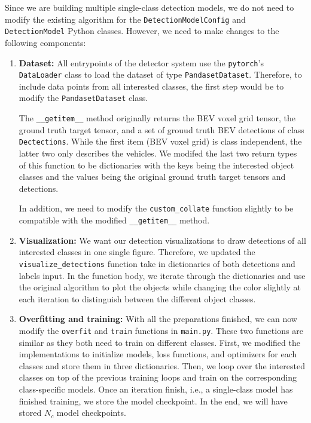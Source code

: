 \documentclass[letter]{article}
\begin{document}
	Since we are building multiple single-class detection models, we do not need to modify the existing algorithm for the \verb|DetectionModelConfig| and \verb|DetectionModel| Python classes. However, we need to make changes to the following components: \begin{enumerate}
		\item \textbf{Dataset:} All entrypoints of the detector system use the \verb|pytorch|'s \verb|DataLoader| class to load the dataset of type \verb|PandasetDataset|. Therefore, to include data points from all interested classes, the first step would be to modify the \verb|PandasetDataset| class. 
		
		The \verb|__getitem__| method originally returns the BEV voxel grid tensor, the ground truth target tensor, and a set of grouud truth BEV detections of class \verb|Dectections|. While the first item (BEV voxel grid) is class independent, the latter two only describes the vehicles. We modifed the last two return types of this function to be dictionaries with the keys being the interested object classes and the values being the original ground truth target tensors and detections. 

		In addition, we need to modify the \verb|custom_collate| function slightly to be compatible with the modified \verb|__getitem__| method. 

		\item \textbf{Visualization:} We want our detection visualizations to draw detections of all interested classes in one single figure. Therefore, we updated the \verb|visualize_detections| function take in dictionaries of both detections and labels input. In the function body, we iterate through the dictionaries and use the original algorithm to plot the objects while changing the color slightly at each iteration to distinguish between the different object classes. 
		
		\item \textbf{Overfitting and training:} With all the preparations finished, we can now modify the \verb|overfit| and \verb|train| functions in \verb|main.py|. These two functions are similar as they both need to train on different classes. First, we modified the implementations to initialize models, loss functions, and optimizers for each classes and store them in three dictionaries. Then, we loop over the interested classes on top of the previous training loops and train on the corresponding class-specific models. Once an iteration finish, i.e., a single-class model has finished training, we store the model checkpoint. In the end, we will have stored $ N_c $ model checkpoints. 
		

\end{enumerate}
\end{document}
